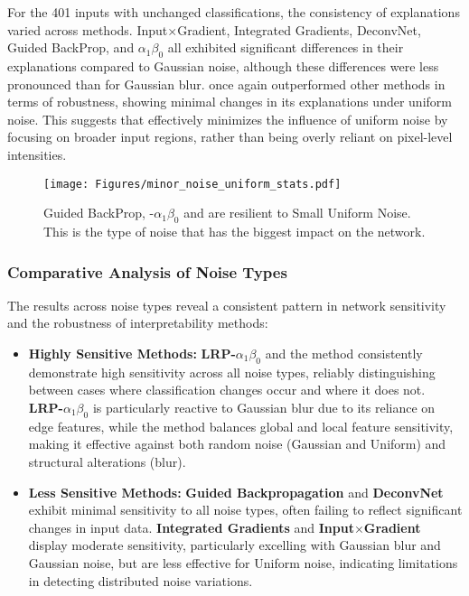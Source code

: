 For the 401 inputs with unchanged classifications, the consistency of explanations varied across methods. Input$\times$Gradient, Integrated Gradients, DeconvNet, Guided BackProp, and \LRP\-$\alpha_1\beta_0$ all exhibited significant differences in their explanations compared to Gaussian noise, although these differences were less pronounced than for Gaussian blur. \CTC\/ once again outperformed other methods in terms of robustness, showing minimal changes in its explanations under uniform noise. This suggests that \CTC\/ effectively minimizes the influence of uniform noise by focusing on broader input regions, rather than being overly reliant on pixel-level intensities.

\begin{figure}[ht!]
	\begin{center}
		\texttt{[image: Figures/minor\_noise\_uniform\_stats.pdf]}
	\end{center}
	\caption{Guided BackProp, \LRP-$\alpha_1\beta_0$ and \CTC\/ are resilient to Small Uniform Noise. This is the type of noise that has the biggest impact on the network.}
	\label{Fig:uniform}
\end{figure} 

\subsubsection{Comparative Analysis of Noise Types}

The results across noise types reveal a consistent pattern in network sensitivity and the robustness of interpretability methods:

\begin{itemize}

    \item \textbf{Highly Sensitive Methods:} \textbf{LRP-$\alpha_1\beta_0$} and the \CTC\/ method consistently demonstrate high sensitivity across all noise types, reliably distinguishing between cases where classification changes occur and where it does not. \textbf{LRP-$\alpha_1\beta_0$} is particularly reactive to Gaussian blur due to its reliance on edge features, while the \CTC\/ method balances global and local feature sensitivity, making it effective against both random noise (Gaussian and Uniform) and structural alterations (blur).

    \item \textbf{Less Sensitive Methods:} \textbf{Guided Backpropagation} and \textbf{DeconvNet} exhibit minimal sensitivity to all noise types, often failing to reflect significant changes in input data. \textbf{Integrated Gradients} and \textbf{Input$\times$Gradient} display moderate sensitivity, particularly excelling with Gaussian blur and Gaussian noise, but are less effective for Uniform noise, indicating limitations in detecting distributed noise variations.
\end{itemize}


